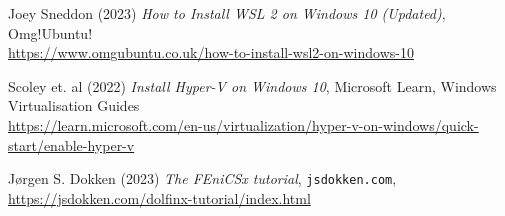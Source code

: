 \documentclass[11pt]{article}
\def\code#1{\texttt{#1}}
\begin{document}
\begin{thebibliography}{9}
Joey Sneddon (2023) \emph{How to Install WSL 2 on Windows 10 (Updated)}, Omg!Ubuntu! \\ \url{https://www.omgubuntu.co.uk/how-to-install-wsl2-on-windows-10}

Scoley et. al (2022) \emph{Install Hyper-V on Windows 10}, Microsoft Learn, Windows Virtualisation Guides \\ \url{https://learn.microsoft.com/en-us/virtualization/hyper-v-on-windows/quick-start/enable-hyper-v}

Jørgen S. Dokken (2023) \emph{The FEniCSx tutorial}, \code{jsdokken.com}, \\ \url{https://jsdokken.com/dolfinx-tutorial/index.html}
\end{thebibliography}
\end{document}
